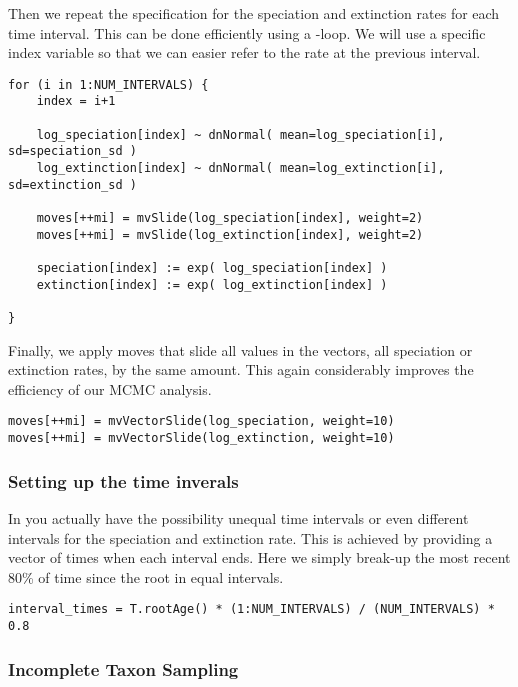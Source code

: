 Then we repeat the specification for the speciation and extinction rates for each time interval.
This can be done efficiently using a -loop.
We will use a specific index variable so that we can easier refer to the rate at the previous interval.
{\tt \begin{snugshade*}
\begin{lstlisting}
for (i in 1:NUM_INTERVALS) {
    index = i+1
    
    log_speciation[index] ~ dnNormal( mean=log_speciation[i], sd=speciation_sd )
    log_extinction[index] ~ dnNormal( mean=log_extinction[i], sd=extinction_sd )

    moves[++mi] = mvSlide(log_speciation[index], weight=2)
    moves[++mi] = mvSlide(log_extinction[index], weight=2)

    speciation[index] := exp( log_speciation[index] )
    extinction[index] := exp( log_extinction[index] )

}
\end{lstlisting}
\end{snugshade*}}
Finally, we apply moves that slide all values in the vectors, \IE all speciation or extinction rates, by the same amount. 
This again considerably improves the efficiency of our MCMC analysis.
{\tt \begin{snugshade*}
\begin{lstlisting}
moves[++mi] = mvVectorSlide(log_speciation, weight=10)
moves[++mi] = mvVectorSlide(log_extinction, weight=10)
\end{lstlisting}
\end{snugshade*}}


\subsubsection{Setting up the time inverals}
In \RevBayes you actually have the possibility unequal time intervals or even different intervals for the speciation and extinction rate.
This is achieved by providing a vector of times when each interval ends.
Here we simply break-up the most recent 80\% of time since the root in equal intervals.
{\tt \begin{snugshade*}
\begin{lstlisting}
interval_times = T.rootAge() * (1:NUM_INTERVALS) / (NUM_INTERVALS) * 0.8
\end{lstlisting}
\end{snugshade*}}


\subsubsection{Incomplete Taxon Sampling}

